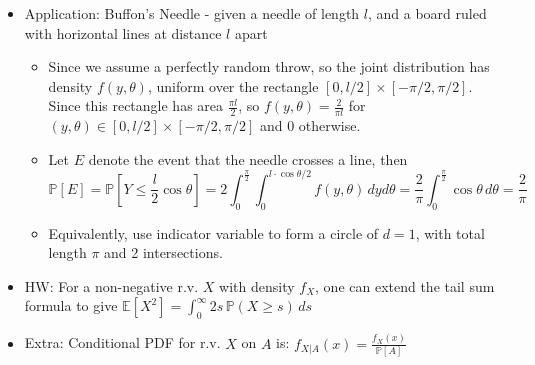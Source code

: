 \documentclass{article}
\begin{document}
\begin{itemize}
	\item Application: Buffon's Needle - given a needle of length $l$, and a board ruled with horizontal lines at distance $l$ apart
	\begin{itemize}
		\item Since we assume a perfectly random throw, so the joint distribution has density $f(y,\theta)$, uniform over the rectangle $[0,l/2]\times[-\pi/2,\pi/2]$. Since this rectangle has area $\frac{\pi l}{2}$, so $f(y,\theta) = \frac{2}{\pi l}$ for $(y,\theta)\in[0,l/2]\times[-\pi/2,\pi/2]$ and 0 otherwise.
		\item Let $E$ denote the event that the needle crosses a line, then
		$$\mathbb{P}[E] = \mathbb{P}[Y\leq \frac{l}{2}\cos\theta] =
		2\int_{0}^{\frac{\pi}{2}} \int_{0}^{l\cdot\cos\theta/2} f(y,\theta) \, dyd\theta = \frac{2}{\pi} \int_{0}^{\frac{\pi}{2}} \cos\theta\, d\theta = \frac{2}{\pi}$$
		\item Equivalently, use indicator variable to form a circle of $d = 1$, with total length $\pi$ and 2 intersections.
	\end{itemize}
	\item HW: For a non-negative r.v. $X$ with density $f_X$, one can extend the tail sum formula to give $\mathbb{E}[X^2] = \int_0^{\infty} 2s\,\mathbb{P}(X\geq s)\, ds$
	\item Extra: Conditional PDF for r.v. $X$ on $A$ is: $f_{X|A}(x) = \frac{f_{X}(x)}{\mathbb{P}[A]}$

\end{itemize}
\end{document}
